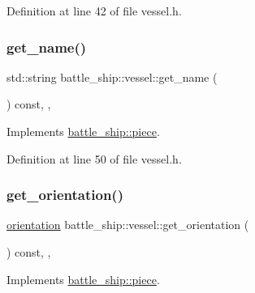 Definition at line 42 of file vessel.\+h.

\mbox{\label{classbattle__ship_1_1vessel_a623a1b35355db117b5381a3a0f5774eb}} 
\subsubsection{\texorpdfstring{get\+\_\+name()}{get\_name()}}
{\footnotesize\ttfamily std\+::string battle\+\_\+ship\+::vessel\+::get\+\_\+name (\begin{DoxyParamCaption}{ }\end{DoxyParamCaption}) const\hspace{0.3cm}{\ttfamily [inline]}, {\ttfamily [override]}, {\ttfamily [virtual]}}



Implements \hyperlink{classbattle__ship_1_1piece_a95531d660360ffc403a742db1b4f6413}{battle\+\_\+ship\+::piece}.



Definition at line 50 of file vessel.\+h.

\mbox{\label{classbattle__ship_1_1vessel_a698c7811878e56b7ba7eb6d88e6ac13f}} 
\subsubsection{\texorpdfstring{get\+\_\+orientation()}{get\_orientation()}}
{\footnotesize\ttfamily \hyperlink{namespacebattle__ship_aed87488f0a73f0d0679fe343fb61c784}{orientation} battle\+\_\+ship\+::vessel\+::get\+\_\+orientation (\begin{DoxyParamCaption}{ }\end{DoxyParamCaption}) const\hspace{0.3cm}{\ttfamily [inline]}, {\ttfamily [override]}, {\ttfamily [virtual]}}



Implements \hyperlink{classbattle__ship_1_1piece_a2cc01b1ec66bfb91df048401233e9618}{battle\+\_\+ship\+::piece}.



